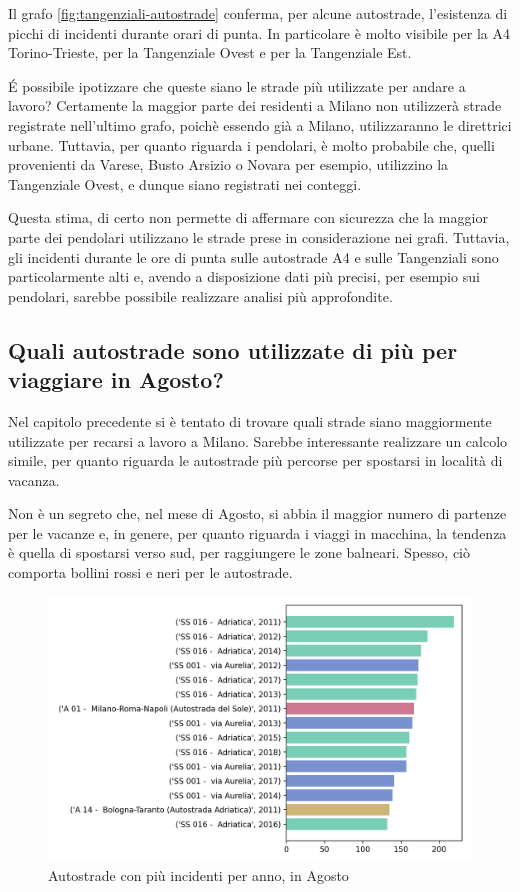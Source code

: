\documentclass[a4paper,12pt]{report}
\begin{document}
Il grafo \ref{fig:tangenziali-autostrade} conferma, per alcune autostrade, 
l'esistenza di picchi di incidenti durante orari di punta. 
In particolare è molto visibile per la A4 Torino-Trieste, 
per la Tangenziale Ovest e per la Tangenziale Est.

\'E possibile ipotizzare che queste siano le strade più utilizzate per 
andare a lavoro? 
Certamente la maggior parte dei residenti a Milano non utilizzerà strade registrate 
nell'ultimo grafo, poichè essendo già a Milano, utilizzaranno le direttrici urbane. 
Tuttavia, per quanto riguarda i pendolari, è molto probabile che, quelli provenienti 
da Varese, Busto Arsizio o Novara per esempio, utilizzino la Tangenziale Ovest, 
e dunque siano registrati nei conteggi. 

Questa stima, di certo non permette di affermare con sicurezza 
che la maggior parte dei pendolari utilizzano le strade prese in considerazione 
nei grafi.
Tuttavia, gli incidenti durante le ore di punta sulle autostrade A4 e sulle 
Tangenziali sono particolarmente alti e, avendo a disposizione dati più 
precisi, per esempio sui pendolari, sarebbe possibile realizzare analisi 
più approfondite.

\subsection{Quali autostrade sono utilizzate di più per viaggiare in Agosto?}

Nel capitolo precedente si è tentato di trovare quali strade siano maggiormente 
utilizzate per recarsi a lavoro a Milano. 
Sarebbe interessante realizzare un calcolo simile, per quanto riguarda le autostrade 
più percorse per spostarsi in località di vacanza. 

Non è un segreto che, nel mese di Agosto, si abbia il maggior numero di 
partenze per le vacanze e, in genere, per quanto riguarda i viaggi 
in macchina, la tendenza è quella di spostarsi verso sud, 
per raggiungere le zone balneari.
Spesso, ciò comporta bollini rossi e neri per le autostrade. 

\begin{figure}
    \includegraphics[width=\linewidth]{../src/incidenti/incidenti_aci/agosto/autostrade_anno_agosto.png}
    \caption{Autostrade con più incidenti per anno, in Agosto}
    \label{fig:autostrade-anno-agosto}
\end{figure}
\end{document}
